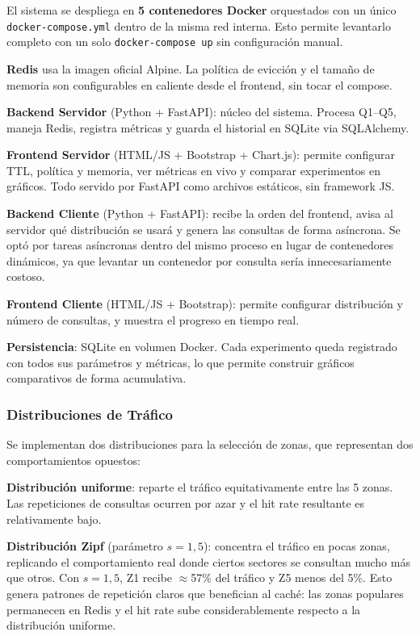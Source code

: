 \documentclass[letter,12pt]{article}
\begin{document}
El sistema se despliega en \textbf{5 contenedores Docker} orquestados con un único
\texttt{docker-compose.yml} dentro de la misma red interna. Esto permite levantarlo
completo con un solo \texttt{docker-compose up} sin configuración manual.

\textbf{Redis} usa la imagen oficial Alpine. La política de evicción y el tamaño de
memoria son configurables en caliente desde el frontend, sin tocar el compose.

\textbf{Backend Servidor} (Python + FastAPI): núcleo del sistema. Procesa Q1--Q5,
maneja Redis, registra métricas y guarda el historial en SQLite via SQLAlchemy.

\textbf{Frontend Servidor} (HTML/JS + Bootstrap + Chart.js): permite configurar TTL,
política y memoria, ver métricas en vivo y comparar experimentos en gráficos. Todo
servido por FastAPI como archivos estáticos, sin framework JS.

\textbf{Backend Cliente} (Python + FastAPI): recibe la orden del frontend, avisa al
servidor qué distribución se usará y genera las consultas de forma asíncrona. Se optó
por tareas asíncronas dentro del mismo proceso en lugar de contenedores dinámicos,
ya que levantar un contenedor por consulta sería innecesariamente costoso.

\textbf{Frontend Cliente} (HTML/JS + Bootstrap): permite configurar distribución y
número de consultas, y muestra el progreso en tiempo real.

\textbf{Persistencia}: SQLite en volumen Docker. Cada experimento queda registrado con
todos sus parámetros y métricas, lo que permite construir gráficos comparativos de forma
acumulativa.

\subsubsection{Distribuciones de Tráfico}

Se implementan dos distribuciones para la selección de zonas, que representan dos
comportamientos opuestos:

\textbf{Distribución uniforme}: reparte el tráfico equitativamente entre las 5 zonas.
Las repeticiones de consultas ocurren por azar y el hit rate resultante es relativamente bajo.

\textbf{Distribución Zipf} (parámetro $s=1{,}5$): concentra el tráfico en pocas zonas,
replicando el comportamiento real donde ciertos sectores se consultan mucho más que otros.
Con $s=1{,}5$, Z1 recibe $\approx$57\% del tráfico y Z5 menos del 5\%. Esto genera
patrones de repetición claros que benefician al caché: las zonas populares permanecen
en Redis y el hit rate sube considerablemente respecto a la distribución uniforme.
\end{document}
